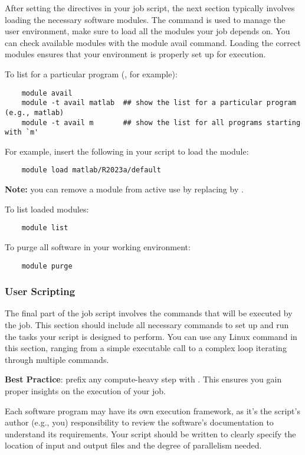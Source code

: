 After setting the directives in your job script, the next section typically involves loading
the necessary software modules. The  command is used to manage the user environment,
make sure to load all the modules your job depends on. You can check available modules with the
module avail command. Loading the correct modules ensures that your environment is properly
set up for execution.

\noindent To list for a particular program (, for example):
\small
\begin{verbatim}
    module avail
    module -t avail matlab  ## show the list for a particular program (e.g., matlab)
    module -t avail m       ## show the list for all programs starting with `m'
\end{verbatim}
\normalsize

For example, insert the following in your script to load the  module:
\begin{verbatim}
    module load matlab/R2023a/default
\end{verbatim}

\textbf{Note:} you can remove a module from active use by replacing  by .

To list loaded modules:
\begin{verbatim}
    module list
\end{verbatim}

To purge all software in your working environment:
\begin{verbatim}
    module purge
\end{verbatim}

\subsubsection{User Scripting}
\label{sect:scripting}

The final part of the job script involves the commands that will be executed by the job.
This section should include all necessary commands to set up and run the tasks
your script is designed to perform. You can use any Linux command in this section,
ranging from a simple executable call to a complex loop iterating through multiple commands.

\noindent \textbf{Best Practice}: prefix any compute-heavy step with .
This ensures you gain proper insights on the execution of your job.

\noindent Each software program may have its own execution framework, as it's the script's author (e.g., you)
responsibility to review the software's documentation to understand its requirements.
Your script should be written to clearly specify the location of input and output files and the degree of parallelism needed.


